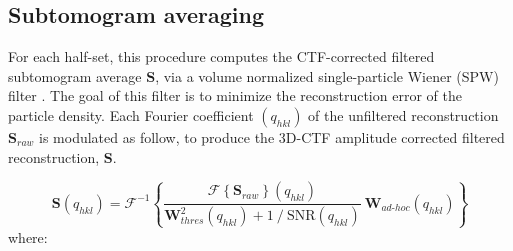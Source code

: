 \subsection{Subtomogram averaging} \label{sec:algo:avg}


For each half-set, this procedure computes the CTF-corrected filtered subtomogram average $\bm{S}$, via a volume normalized single-particle Wiener (SPW) filter \cite{volume_normalized_SPW}. The goal of this filter is to minimize the reconstruction error of the particle density. Each Fourier coefficient $(q_{hkl})$ of the unfiltered reconstruction $\bm{S}_{raw}$ is modulated as follow, to produce the 3D-CTF amplitude corrected filtered reconstruction, $\bm{S}$.

\begin{equation} \label{eq:wiener_filter}
    \bm{S}({q}_{hkl}) = 
        \mathcal{F}^{-1} \left\{ 
            \dfrac{ \mathcal{F} \left\{ \bm{S}_{raw} \right\}({q}_{hkl}) }{ \bm{W}_{thres}^{2}({q}_{hkl}) + {1}\ /\ {\bm{\mathrm{SNR}}({q}_{hkl})} }\ \bm{W}_{ad\text{-}hoc}({q}_{hkl})
        \right\}
\end{equation}
where:
